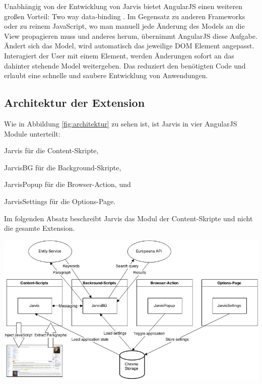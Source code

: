  Unabhängig von der Entwicklung von Jarvis bietet AngularJS einen weiteren großen Vorteil: Two way data-binding \cite{jain2015angularjs}. Im Gegensatz zu anderen Frameworks oder zu reinem JavaScript, wo man manuell jede Änderung des Models an die View propagieren muss und anderes herum, übernimmt AngularJS diese Aufgabe. Ändert sich das Model, wird automatisch das jeweilige DOM Element angepasst. Interagiert der User mit einem Element, werden Änderungen sofort an das dahinter stehende Model weitergeben. Das reduziert den benötigten Code und erlaubt eine schnelle und saubere Entwicklung von Anwendungen.

 \subsection{Architektur der Extension}
 Wie in Abbildung \ref{fig:architektur} zu sehen ist, ist Jarvis in vier AngularJS Module unterteilt:
 \begin{enumerate*}[label=\alph*\upshape)]
 	\item Jarvis für die Content-Skripte,
  	\item JarvisBG für die Background-Skripte,
 	\item JarvisPopup für die Browser-Action, und
 	\item JarvisSettings für die Options-Page.
 \end{enumerate*}
 Im folgenden Absatz beschreibt Jarvis das Modul der Content-Skripte und nicht die gesamte Extension.

 \begin{minipage}{\linewidth}
	\centering
	\includegraphics[width=\linewidth]{Bilder/architektur.jpg}
	\label{fig:architektur}
 \end{minipage}
 
